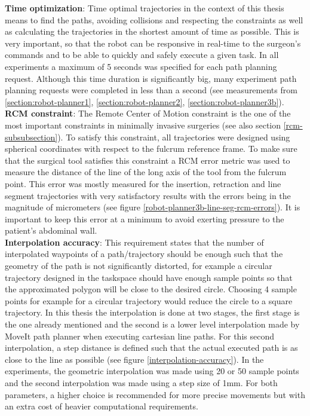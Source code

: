 \textbf{Time optimization}: Time optimal trajectories in the context of this thesis means to find the paths, avoiding collisions and respecting the constraints as well as calculating the trajectories in the shortest amount of time as 
possible. This is very important, so that the robot can be responsive in real-time to the surgeon’s commands and to be able to quickly and safely execute a given task. In all experiments a maximum of 5 seconds was specified 
for each path planning request. Although this time duration is significantly big, many experiment path planning requests were completed in less than a second 
(see measurements from \ref{section:robot-planner1}, \ref{section:robot-planner2}, \ref{section:robot-planner3b}).\\

\textbf{RCM constraint}: The Remote Center of Motion constraint is the one of the most important constraints in minimally invasive surgeries (see also section \ref{rcm-subsubsection}). To satisfy this constraint, all trajectories were designed using 
spherical coordinates with respect to the fulcrum reference frame. To make sure that the surgical tool satisfies this constraint a RCM error metric was used to measure the distance of the line of the long axis of the tool 
from the fulcrum point. This error was mostly measured for the insertion, retraction and line segment trajectories with very satisfactory results with the errors being in the magnitude of micrometers 
(see figure \ref{robot-planner3b-line-seg-rcm-errors}). It is important to keep this error at a minimum to avoid exerting pressure to the patient’s abdominal wall.\\

\textbf{Interpolation accuracy}: This requirement states that the number of interpolated waypoints of a path/trajectory should be enough such that the geometry of the path is not significantly distorted, for example a circular 
trajectory designed in the taskspace should have enough sample points so that the approximated polygon will be close to the desired circle. Choosing 4 sample points for example for a circular trajectory would reduce the 
circle to a square trajectory. In this thesis the interpolation is done at two stages, the first stage is the one already mentioned and the second is a lower level interpolation made by MoveIt path planner when executing 
cartesian line paths. For this second interpolation, a step distance is defined such that the actual executed path is as close to the line as possible (see figure \ref{interpolation-accuracy}). In the experiments, the 
geometric interpolation was made using 20 or 50 sample points and the second interpolation was made using a step size of 1mm. For both parameters, a higher choice is recommended for more precise movements but with an extra 
cost of heavier computational requirements.\\

